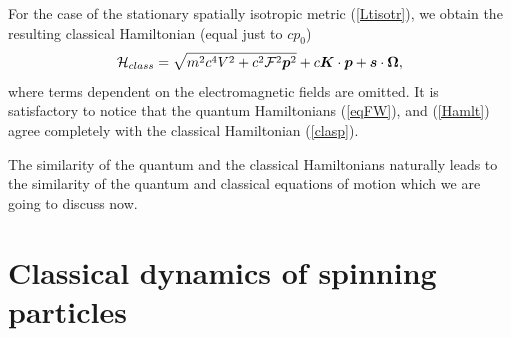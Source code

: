 \documentclass[preprint,showpacs,preprintnumbers,eqsecnum,amsmath,amssymb]{revtex4}
\begin{document}
For the case of the stationary spatially isotropic metric (\ref{Ltisotr}), 
we obtain the resulting classical Hamiltonian (equal just to $cp_0$)
\begin{equation}
{\cal H}_{class}=\sqrt{m^2c^4V^2+c^2{\cal F}^2\bm p^2} + c{\bm
K}\cdot{\bm p} + \bm s\cdot\bm\Omega, \label{clasp}
\end{equation}
where terms dependent on the electromagnetic fields are omitted.
It is satisfactory to notice that the quantum Hamiltonians
(\ref{eqFW}), and (\ref{Hamlt}) agree completely with the
classical Hamiltonian (\ref{clasp}).

The similarity of the quantum and the classical Hamiltonians
naturally leads to the similarity of the quantum and classical
equations of motion which we are going to discuss now.


\section{Classical dynamics of spinning particles}\label{CS}
\end{document}
